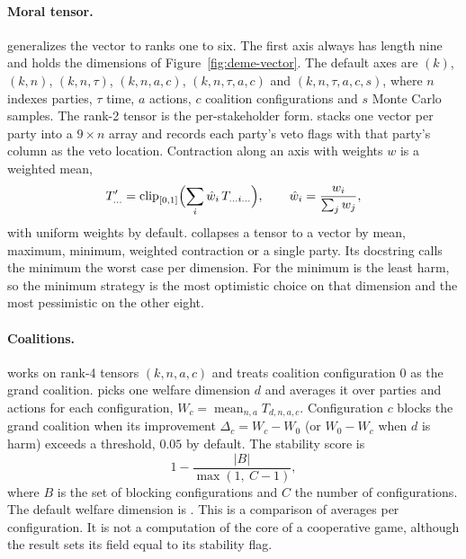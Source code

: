 \paragraph{Moral tensor.}  generalizes the vector to ranks one to six. The first
axis always has length nine and holds the dimensions of Figure~\ref{fig:deme-vector}. The
default axes are $(k)$, $(k,n)$, $(k,n,\tau)$, $(k,n,a,c)$, $(k,n,\tau,a,c)$ and
$(k,n,\tau,a,c,s)$, where $n$ indexes parties, $\tau$ time, $a$ actions, $c$ coalition
configurations and $s$ Monte Carlo samples. The rank-2 tensor is the per-stakeholder form.
 stacks one vector per party into a $9 \times n$ array and records
each party's veto flags with that party's column as the veto location. Contraction along an
axis with weights $w$ is a weighted mean,
\begin{equation}
T'_{\dots} = \operatorname{clip}_{[0,1]}\Bigl(\sum_{i} \hat w_i\, T_{\dots i \dots}\Bigr),
\qquad \hat w_i = \frac{w_i}{\sum_j w_j},
\label{eq:deme-contract}
\end{equation}
with uniform weights by default.  collapses a tensor to a vector by mean, maximum,
minimum, weighted contraction or a single party. Its docstring calls the minimum the worst case
per dimension. For  the minimum is the least harm, so the minimum strategy
is the most optimistic choice on that dimension and the most pessimistic on the other eight.

\paragraph{Coalitions.}  works on rank-4 tensors $(k,n,a,c)$ and treats
coalition configuration $0$ as the grand coalition.  picks one
welfare dimension $d$ and averages it over parties and actions for each configuration,
$W_c = \operatorname{mean}_{n,a} T_{d,n,a,c}$. Configuration $c$ blocks the grand coalition when
its improvement $\Delta_c = W_c - W_0$ (or $W_0 - W_c$ when $d$ is harm) exceeds a threshold,
$0.05$ by default. The stability score is
\begin{equation}
1 - \frac{|B|}{\max(1,\ C-1)},
\label{eq:deme-stability}
\end{equation}
where $B$ is the set of blocking configurations and $C$ the number of configurations. The default
welfare dimension is . This is a comparison of averages per configuration.
It is not a computation of the core of a cooperative game, although the result sets its
 field equal to its stability flag.

